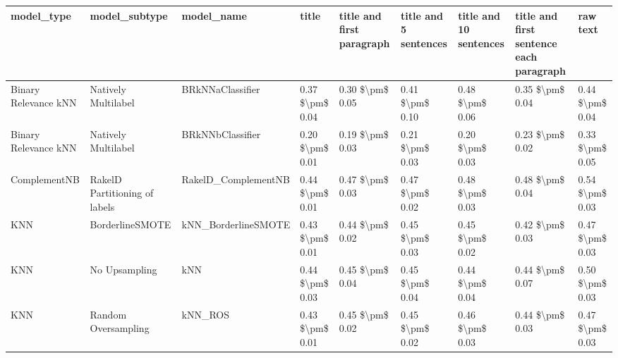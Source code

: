 \begin{tabular}{lllllllll}
\toprule
                     model\_type &                 model\_subtype &                                   model\_name &           title & title and first paragraph & title and 5 sentences & title and 10 sentences & title and first sentence each paragraph &            raw text \\
\midrule
           Binary Relevance kNN &           Natively Multilabel &                             BRkNNaClassifier & 0.37 \$\textbackslash pm\$ 0.04 &           0.30 \$\textbackslash pm\$ 0.05 &       0.41 \$\textbackslash pm\$ 0.10 &        0.48 \$\textbackslash pm\$ 0.06 &                         0.35 \$\textbackslash pm\$ 0.04 &     0.44 \$\textbackslash pm\$ 0.04 \\
           Binary Relevance kNN &           Natively Multilabel &                             BRkNNbClassifier & 0.20 \$\textbackslash pm\$ 0.01 &           0.19 \$\textbackslash pm\$ 0.03 &       0.21 \$\textbackslash pm\$ 0.03 &        0.20 \$\textbackslash pm\$ 0.03 &                         0.23 \$\textbackslash pm\$ 0.02 &     0.33 \$\textbackslash pm\$ 0.05 \\
                   ComplementNB & RakelD Partitioning of labels &                          RakelD\_ComplementNB & 0.44 \$\textbackslash pm\$ 0.01 &           0.47 \$\textbackslash pm\$ 0.03 &       0.47 \$\textbackslash pm\$ 0.02 &        0.48 \$\textbackslash pm\$ 0.03 &                         0.48 \$\textbackslash pm\$ 0.04 &     0.54 \$\textbackslash pm\$ 0.03 \\
                            KNN &               BorderlineSMOTE &                          kNN\_BorderlineSMOTE & 0.43 \$\textbackslash pm\$ 0.01 &           0.44 \$\textbackslash pm\$ 0.02 &       0.45 \$\textbackslash pm\$ 0.03 &        0.45 \$\textbackslash pm\$ 0.02 &                         0.42 \$\textbackslash pm\$ 0.03 &     0.47 \$\textbackslash pm\$ 0.03 \\
                            KNN &                 No Upsampling &                                          kNN & 0.44 \$\textbackslash pm\$ 0.03 &           0.45 \$\textbackslash pm\$ 0.04 &       0.45 \$\textbackslash pm\$ 0.04 &        0.44 \$\textbackslash pm\$ 0.04 &                         0.44 \$\textbackslash pm\$ 0.07 &     0.50 \$\textbackslash pm\$ 0.03 \\
                            KNN &           Random Oversampling &                                      kNN\_ROS & 0.43 \$\textbackslash pm\$ 0.01 &           0.45 \$\textbackslash pm\$ 0.02 &       0.45 \$\textbackslash pm\$ 0.02 &        0.46 \$\textbackslash pm\$ 0.03 &                         0.44 \$\textbackslash pm\$ 0.03 &     0.47 \$\textbackslash pm\$ 0.03 \\

\end{tabular}
